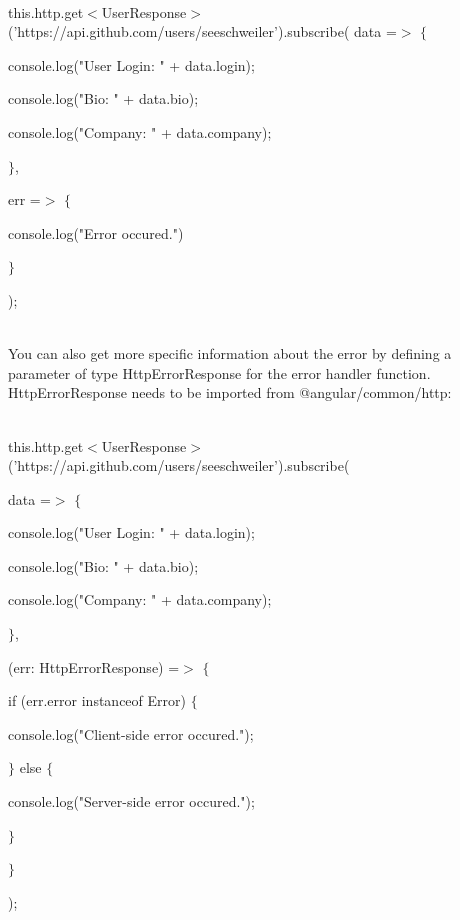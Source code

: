 \documentclass{article}
\begin{document}
\noindent \\ this.http.get$\mathrm{<}$UserResponse$\mathrm{>}$('https://api.github.com/users/seeschweiler').subscribe( data =$\mathrm{>}$ $\mathrm{\{}$

\noindent console.log("User Login: " + data.login); 

\noindent console.log("Bio: " + data.bio); 

\noindent console.log("Company: " + data.company);

\noindent $\mathrm{\}}$,

\noindent err =$\mathrm{>}$ $\mathrm{\{}$

\noindent console.log("Error occured.")

\noindent $\mathrm{\}}$

\noindent );

\noindent 

\noindent 

\noindent 

\noindent \\ You can also get more specific information about the error by defining a parameter of type HttpErrorResponse for the error handler function. HttpErrorResponse needs to be imported from @angular/common/http: 

\noindent \\ this.http.get$\mathrm{<}$UserResponse$\mathrm{>}$('https://api.github.com/users/seeschweiler').subscribe(

\noindent data =$\mathrm{>}$ $\mathrm{\{}$

\noindent console.log("User Login: " + data.login); 

\noindent console.log("Bio: " + data.bio); 

\noindent console.log("Company: " + data.company);

\noindent $\mathrm{\}}$,

\noindent (err: HttpErrorResponse) =$\mathrm{>}$ $\mathrm{\{}$

\noindent if (err.error instanceof Error) $\mathrm{\{}$ 

\noindent console.log("Client-side error occured.");

\noindent $\mathrm{\}}$ else $\mathrm{\{}$

\noindent console.log("Server-side error occured.");

\noindent $\mathrm{\}}$

\noindent $\mathrm{\}}$

\noindent );

\newpage
\end{document}

